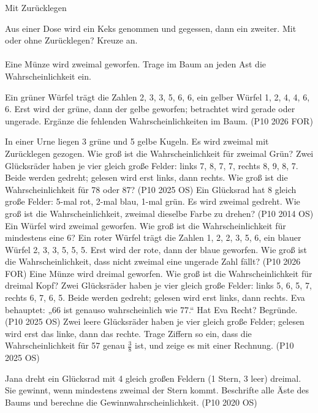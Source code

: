 \begin{aufgabe}{Mit Zurücklegen}
\begin{teile}
\teil Aus einer Dose wird ein Keks genommen und gegessen, dann ein zweiter. Mit oder ohne Zurücklegen? Kreuze an. \\  \\ 
\teil Eine Münze wird zweimal geworfen. Trage im Baum an jeden Ast die Wahrscheinlichkeit ein.

\teil Ein grüner Würfel trägt die Zahlen 2, 3, 3, 5, 6, 6, ein gelber Würfel 1, 2, 4, 4, 6, 6. Erst wird der grüne, dann der gelbe geworfen; betrachtet wird gerade oder ungerade. Ergänze die fehlenden Wahrscheinlichkeiten im Baum. \hfill (P10 2026 FOR)

\teil In einer Urne liegen 3 grüne und 5 gelbe Kugeln. Es wird zweimal mit Zurücklegen gezogen. Wie groß ist die Wahrscheinlichkeit für zweimal Grün?
\teil Zwei Glücksräder haben je vier gleich große Felder: links 7, 8, 7, 7, rechts 8, 9, 8, 7. Beide werden gedreht; gelesen wird erst links, dann rechts. Wie groß ist die Wahrscheinlichkeit für 78 oder 87? \hfill (P10 2025 OS)
\teil Ein Glücksrad hat 8 gleich große Felder: 5-mal rot, 2-mal blau, 1-mal grün. Es wird zweimal gedreht. Wie groß ist die Wahrscheinlichkeit, zweimal dieselbe Farbe zu drehen? \hfill (P10 2014 OS)
\teil Ein Würfel wird zweimal geworfen. Wie groß ist die Wahrscheinlichkeit für mindestens eine 6?
\teil Ein roter Würfel trägt die Zahlen 1, 2, 2, 3, 5, 6, ein blauer Würfel 2, 3, 3, 5, 5, 5. Erst wird der rote, dann der blaue geworfen. Wie groß ist die Wahrscheinlichkeit, dass nicht zweimal eine ungerade Zahl fällt? \hfill (P10 2026 FOR)
\teil Eine Münze wird dreimal geworfen. Wie groß ist die Wahrscheinlichkeit für dreimal Kopf?
\teil Zwei Glücksräder haben je vier gleich große Felder: links 5, 6, 5, 7, rechts 6, 7, 6, 5. Beide werden gedreht; gelesen wird erst links, dann rechts. Eva behauptet: „66 ist genauso wahrscheinlich wie 77.“ Hat Eva Recht? Begründe. \hfill (P10 2025 OS)
\teil Zwei leere Glücksräder haben je vier gleich große Felder; gelesen wird erst das linke, dann das rechte. Trage Ziffern so ein, dass die Wahrscheinlichkeit für 57 genau $\frac{3}{8}$ ist, und zeige es mit einer Rechnung. \hfill (P10 2025 OS)

 
\teil Jana dreht ein Glücksrad mit 4 gleich großen Feldern (1 Stern, 3 leer) dreimal. Sie gewinnt, wenn mindestens zweimal der Stern kommt. Beschrifte alle Äste des Baums und berechne die Gewinnwahrscheinlichkeit. \hfill (P10 2020 OS)

\end{teile}
\end{aufgabe}

